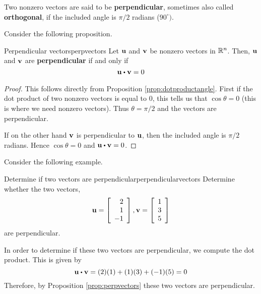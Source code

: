 Two nonzero  vectors are said to be \textbf{perpendicular}, sometimes also called \textbf{orthogonal}, if
the included angle is $\pi /2$ radians ($90^{\circ }).$

Consider the following proposition.

\begin{proposition}{Perpendicular vectors}{perpvectors}
Let ${\bf u}$ and ${\bf v}$ be nonzero vectors in $\mathbb{R}^n$. Then, 
${\bf u}$ and ${\bf v}$ are \textbf{perpendicular} if and only if
\begin{equation*}
\vect{u}
\dotprod
\vect{v}
=
0
\end{equation*}
\end{proposition}

\begin{proof}
This follows directly from Proposition \ref{prop:dotproductangle}. First if the dot product of
two nonzero vectors is equal to $0$, this tells us that $\cos \theta
=0$ (this is where we need nonzero vectors). Thus $\theta = \pi /2$
and the vectors are perpendicular.

If on the other hand ${\bf v}$ is perpendicular to ${\bf u}$, then 
the included angle is $\pi /2$ radians. Hence $\cos \theta =0$ and 
$\vect{u} \dotprod \vect{v} = 0$.
\end{proof}

Consider the following example.

\begin{example}{Determine if two vectors are perpendicular}{perpendicularvectors}
Determine whether the two vectors, 
\begin{equation*}
{\bf u}=
\left[
\begin{array}{r}
2 \\
1 \\
-1 
\end{array}
\right], 
{\bf v} 
=
\left[
\begin{array}{r}
1 \\
3 \\
5
\end{array}
\right]
\end{equation*}
 are perpendicular.
\end{example}

\begin{solution}
In order to determine if these two vectors are perpendicular, we compute the dot product.
This is given by
\begin{equation*}
\vect{u} \dotprod \vect{v}
=
(2)(1) + (1)(3) + (-1)(5)
=
0
\end{equation*}
Therefore, by Proposition \ref{prop:perpvectors} these two vectors are perpendicular.
\end{solution}
